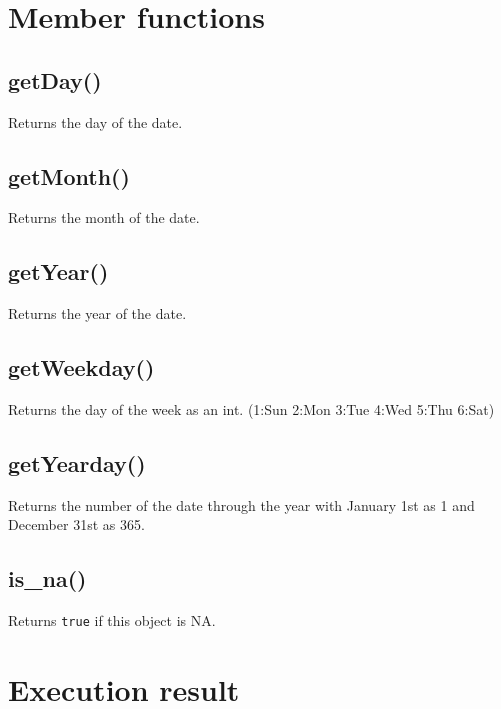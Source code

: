 \documentclass[
]{book}
\begin{document}
\hypertarget{member-functions}{%
\section{Member functions}\label{member-functions}}

\hypertarget{getday}{%
\subsection{getDay()}\label{getday}}

Returns the day of the date.

\hypertarget{getmonth}{%
\subsection{getMonth()}\label{getmonth}}

Returns the month of the date.

\hypertarget{getyear}{%
\subsection{getYear()}\label{getyear}}

Returns the year of the date.

\hypertarget{getweekday}{%
\subsection{getWeekday()}\label{getweekday}}

Returns the day of the week as an int. (1:Sun 2:Mon 3:Tue 4:Wed 5:Thu 6:Sat)

\hypertarget{getyearday}{%
\subsection{getYearday()}\label{getyearday}}

Returns the number of the date through the year with January 1st as 1 and December 31st as 365.

\hypertarget{is_na}{%
\subsection{is\_na()}\label{is_na}}

Returns \texttt{true} if this object is NA.

\hypertarget{execution-result}{%
\section{Execution result}\label{execution-result}}
\end{document}
